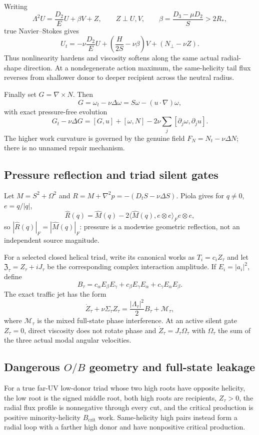 \documentclass[11pt]{article}
\begin{document}
Writing
\[
\Lambda^2U=\frac{D_2}{E}U+\beta V+Z,
\qquad Z\perp U,V,
\qquad \beta=\frac{D_3-\mu D_2}{S}>2R_*,
\]
true Navier--Stokes gives
\[
U_t
=-\nu\frac{D_2}{E}U
+\left(\frac{H}{2S}-\nu\beta\right)V
+(N_\perp-\nu Z).
\]
Thus nonlinearity hardens and viscosity softens along the same actual radial-shape direction.  At a nondegenerate action maximum, the same-helicity tail flux reverses from shallower donor to deeper recipient across the neutral radius.

Finally set $G=\nabla\times N$.  Then
\[
G=\omega_t-\nu\Delta\omega=S\omega-(u\cdot\nabla)\omega,
\]
with exact pressure-free evolution
\[
G_t-\nu\Delta G=[G,u]+[\omega,N]-2\nu\sum_j[\partial_j\omega,\partial_j u].
\]
The higher work curvature is governed by the genuine field $F_N=N_t-\nu\Delta N$; there is no unnamed repair mechanism.

\subsection{Pressure reflection and triad silent gates}
Let $M=S^2+\Omega^2$ and $R=M+\nabla^2p=-(D_tS-\nu\Delta S)$.  Piola gives for $q\ne0$, $e=q/|q|$,
\[
\widehat R(q)
=\widehat M(q)-2\langle\widehat M(q),e\otimes e\rangle_F e\otimes e,
\]
so $|\widehat R(q)|_F=|\widehat M(q)|_F$: pressure is a modewise geometric reflection, not an independent source magnitude.

For a selected closed helical triad, write its canonical works as $T_i=c_iZ_\tau$ and let $\mathfrak Z_\tau=Z_\tau+iJ_\tau$ be the corresponding complex interaction amplitude.  If $E_i=|a_i|^2$, define
\[
B_\tau
=c_\alpha E_\beta E_\gamma
+c_\beta E_\gamma E_\alpha
+c_\gamma E_\alpha E_\beta.
\]
The exact traffic jet has the form
\[
\dot Z_\tau+\nu\Sigma_\tau Z_\tau
=\frac{|\Lambda_\tau|^2}{2}B_\tau+\mathcal M_\tau,
\]
where $\mathcal M_\tau$ is the mixed full-state phase interference.  At an active silent gate $Z_\tau=0$, direct viscosity does not rotate phase and $\dot Z_\tau=J_\tau\Omega_\tau$ with $\Omega_\tau$ the sum of the three actual modal angular velocities.

\subsection{Dangerous $O/B$ geometry and full-state leakage}
For a true far-UV low-donor triad whose two high roots have opposite helicity, the low root is the signed middle root, both high roots are recipients, $Z_\tau>0$, the radial flux profile is nonnegative through every cut, and the critical production is positive minority-helicity $B_{\mathrm{crit}}$ work.  Same-helicity high pairs instead form a radial loop with a farther high donor and have nonpositive critical production.
\end{document}
